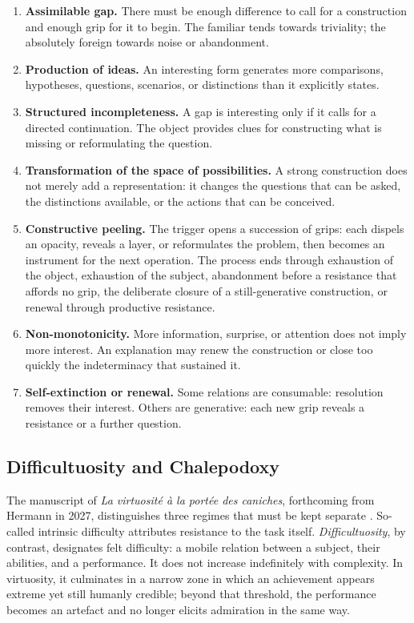 \documentclass[11pt,a4paper]{article}
\begin{document}
\begin{enumerate}[resume]
  \item \textbf{Assimilable gap.} There must be enough difference to call for a
        construction and enough grip for it to begin. The familiar tends
        towards triviality; the absolutely foreign towards noise or
        abandonment.
  \item \textbf{Production of ideas.} An interesting form generates
        more comparisons, hypotheses, questions, scenarios, or distinctions
        than it explicitly states.
  \item \textbf{Structured incompleteness.} A gap is interesting only if it
        calls for a directed continuation. The object provides clues for
        constructing what is missing or reformulating the question.
  \item \textbf{Transformation of the space of possibilities.} A strong
        construction does not merely add a representation: it changes the
        questions that can be asked, the distinctions available, or the actions
        that can be conceived.
  \item \textbf{Constructive peeling.} The trigger opens a succession of
        grips: each dispels an opacity, reveals a layer, or reformulates the
        problem, then becomes an instrument for the next operation. The process
        ends through exhaustion of the object, exhaustion of the subject,
        abandonment before a resistance that affords no grip, the deliberate
        closure of a still-generative construction, or renewal through
        productive resistance.
  \item \textbf{Non-monotonicity.} More information, surprise, or attention does
        not imply more interest. An explanation may renew the construction or
        close too quickly the indeterminacy that sustained it.
  \item \textbf{Self-extinction or renewal.} Some relations are consumable:
        resolution removes their interest. Others are generative: each new grip
        reveals a resistance or a further question.
\end{enumerate}

\subsection{Difficultuosity and Chalepodoxy}

The manuscript of \emph{La virtuosité à la portée des caniches}, forthcoming
from Hermann in 2027, distinguishes three regimes that must be kept separate
\parencite[manuscript, 13--16]{pachet2027virtuosite}. So-called intrinsic
difficulty attributes resistance to the task itself. \emph{Difficultuosity}, by
contrast, designates felt difficulty: a mobile relation between a subject,
their abilities, and a performance. It does not increase indefinitely with
complexity. In virtuosity, it culminates in a narrow zone in which an
achievement appears extreme yet still humanly credible; beyond that threshold,
the performance becomes an artefact and no longer elicits admiration in the
same way.
\end{document}
